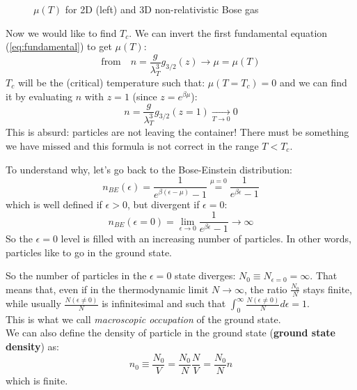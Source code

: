 \begin{figure}[ht]
    \centering
    \begin{subfigure}[b]{0.48\textwidth}
        \centering
    \end{subfigure}
    \begin{subfigure}[b]{0.48\textwidth}
        \centering
    \end{subfigure}
    \caption{$\mu(T)$ for 2D (left) and 3D non-relativistic Bose gas}
    \label{fig:mu(T)}
\end{figure}

Now we would like to find $T_c$. We can invert the first fundamental equation (\ref{eq:fundamental}) to get $\mu(T)$:
$$\text{from} \quad n = \frac g{\lambda_T^3} g_{3/2}(z) \to \mu = \mu(T)$$
$T_c$ will be the (critical) temperature such that: $\mu(T=T_c) = 0$ and we can find it by evaluating $n$ with $z=1$ (since $z=e^{\beta\mu}$):
$$ n = \frac g{\lambda_T^3} g_{3/2}(z=1) \xrightarrow[T\to 0]{} 0$$
This is absurd: particles are not leaving the container! There must be something we have missed and this formula is not correct in the range $T < T_c$.

To understand why, let's go back to the Bose-Einstein distribution:
$$n_{BE}(\epsilon) = \frac1{e^{\beta(\epsilon-\mu)}-1} \stackrel{\mu=0}= \frac 1{e^{\beta\epsilon}-1}$$ 
which is well defined if $\epsilon > 0$, but divergent if $\epsilon =0$:
$$n_{BE}(\epsilon = 0) = \lim_{\epsilon\to 0}\frac1{e^{\beta\epsilon}-1} \to \infty$$ 
So the $\epsilon = 0$ level is filled with an increasing number of particles. In other words, particles like to go in the ground state.

So the number of particles in the $\epsilon =0$ state diverges: $N_0 \equiv N_{\epsilon=0} = \infty$.
That means that, even if in the thermodynamic limit $N\to \infty$, the ratio $\frac {N_0}N$ stays finite, while usually $\frac{N(\epsilon\ne 0)}N$ is infinitesimal and such that $\int_0^\infty \frac{N(\epsilon\ne0)}N d\epsilon = 1$.\\
This is what we call \textit{macroscopic occupation} of the ground state.\\
We can also define the density of particle in the ground state (\textbf{ground state density}) as: 
$$n_0\equiv \frac{N_0}V = \frac{N_0}N\frac NV = \frac{N_0}N n$$
which is finite.

